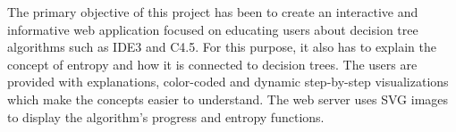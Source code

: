 
The primary objective of this project has been to create an interactive and informative web application focused on educating users about decision tree algorithms such as IDE3 and C4.5. For this purpose, it also has to explain the concept of entropy and how it is connected to decision trees. The users are provided with explanations, color-coded and dynamic step-by-step visualizations which make the concepts easier to understand. The web server uses SVG images to display the algorithm's progress and entropy functions. 